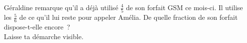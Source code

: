 %
%
Géraldine remarque qu'il a déjà utilisé \(\frac{4}{5}\) de son forfait GSM ce mois-ci. Il utilise les \(\frac{5}{6}\) de ce qu'il lui reste pour appeler Amélia. De quelle fraction de son forfait dispose-t-elle encore~? \\
  Laisse ta démarche visible.
